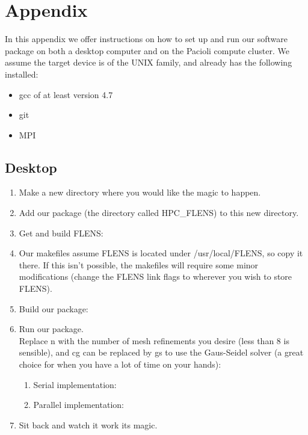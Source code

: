 \newpage
\appendix
{}
\section{Appendix}

In this appendix we offer instructions on how to set up and run our software package on both a desktop computer and on the Pacioli compute cluster. We assume the target device is of the UNIX family, and already has the following installed:

\begin{itemize}
   \item gcc of at least version 4.7
   \item git
   \item MPI
\end{itemize}

\subsection{Desktop}

\begin{enumerate}
   \item Make a new directory where you would like the magic to happen.
   \item Add our package (the directory called HPC\_FLENS) to this new directory.
   \item Get and build FLENS: 
   
   \item Our makefiles assume FLENS is located under /usr/local/FLENS, so copy it there. If this isn't possible, the makefiles will require some minor modifications (change the FLENS link flags to wherever you wish to store FLENS).
   
   \item Build our package:
   
   \item Run our package.\\
   Replace n with the number of mesh refinements you desire (less than 8 is sensible), and cg can be replaced by gs to use the Gaus-Seidel solver (a great choice for when you have a lot of time on your hands):
   
   \begin{enumerate}
   
      \item Serial implementation:
      \item Parallel implementation:
      
   \end{enumerate}
   
   \item Sit back and watch it work its magic.
\end{enumerate}
      
